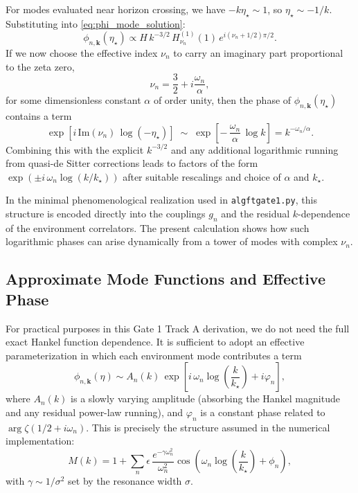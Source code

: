 \documentclass[12pt]{article}
\begin{document}
For modes evaluated near horizon crossing, we have \(-k\eta_\star \sim 1\),
so \(\eta_\star \sim -1/k\). Substituting into \eqref{eq:phi_mode_solution}:
\begin{equation}
\phi_{n,\bm{k}}(\eta_\star) \propto H\, k^{-3/2}
\, H^{(1)}_{\nu_n}(1)\, e^{i(\nu_n + 1/2)\pi/2}.
\label{eq:phi_horizon_crossing}
\end{equation}
If we now choose the effective index \(\nu_n\) to carry an imaginary part
proportional to the zeta zero,
\begin{equation}
\nu_n = \frac{3}{2} + i \frac{\omega_n}{\alpha},
\label{eq:nu_with_imag_part}
\end{equation}
for some dimensionless constant \(\alpha\) of order unity, then the phase
of \(\phi_{n,\bm{k}}(\eta_\star)\) contains a term
\begin{equation}
\exp\left[i\, \text{Im}(\nu_n)\, \log(-\eta_\star)\right]
\;\sim\;
\exp\left[-\,\frac{\omega_n}{\alpha}\, \log k\right]
= k^{-\omega_n/\alpha}.
\end{equation}
Combining this with the explicit \(k^{-3/2}\) and any additional
logarithmic running from quasi-de Sitter corrections leads to factors of the form
\(\exp\left(\pm i\, \omega_n \log(k/k_\star)\right)\) after suitable rescalings and
choice of \(\alpha\) and \(k_\star\).

In the minimal phenomenological realization used in \texttt{algftgate1.py},
this structure is encoded directly into the couplings \(g_n\) and the residual
\(k\)-dependence of the environment correlators. The present calculation shows
how such logarithmic phases can arise dynamically from a tower of modes with
complex \(\nu_n\).

\subsection{Approximate Mode Functions and Effective Phase}

For practical purposes in this Gate 1 Track A derivation, we do not need the
full exact Hankel function dependence. It is sufficient to adopt an effective
parameterization in which each environment mode contributes a term
\begin{equation}
\phi_{n,\bm{k}}(\eta) \sim A_n(k)\,
\exp\left[i\, \omega_n \log\left(\frac{k}{k_\star}\right) + i\varphi_n\right],
\label{eq:phi_effective_log}
\end{equation}
where \(A_n(k)\) is a slowly varying amplitude (absorbing the Hankel magnitude
and any residual power-law running), and \(\varphi_n\) is a constant phase
related to \(\arg \zeta(1/2 + i\omega_n)\). This is precisely the structure
assumed in the numerical implementation:
\begin{equation}
M(k) = 1 + \sum_n \epsilon\, \frac{e^{-\gamma \omega_n^2}}{\omega_n^2}
\cos\left(\omega_n \log\left(\frac{k}{k_\star}\right) + \phi_n\right),
\end{equation}
with \(\gamma \sim 1/\sigma^2\) set by the resonance width \(\sigma\).
\end{document}
